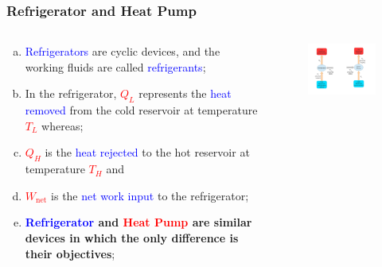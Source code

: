 \documentclass[10pt,compress,handout,ignorenonframetext]{beamer}
\begin{document}
\begin{frame}
 \frametitle{Refrigerator and Heat Pump}
  \begin{columns}
   \begin{column}[c]{0.45\linewidth}
     \begin{enumerate}[(a)]
     \item <1-> \textcolor{blue}{Refrigerators} are cyclic devices, and the working fluids are called \textcolor{blue}{refrigerants};
     \item <2-> In the refrigerator, \textcolor{red}{$Q_{L}$} represents the \textcolor{blue}{heat removed} from the cold reservoir at temperature \textcolor{red}{$T_{L}$} whereas;
     \item <3-> \textcolor{red}{$Q_{H}$} is the \textcolor{blue}{heat rejected} to the hot reservoir at temperature \textcolor{red}{$T_{H}$} and 
     \item <4-> \textcolor{red}{$W_{\text{net}}$} is the \textcolor{blue}{net work input} to the refrigerator;
     \item <5-> {\bf \textcolor{blue}{Refrigerator} and \textcolor{red}{Heat Pump} are similar devices in which the only difference is their objectives};
    \end{enumerate}
   \end{column}
   \begin{column}[c]{0.55\linewidth}
    \begin{figure}%
     \begin{center}
      \includegraphics[width=7.5cm,clip]{./Pics/Overview_Refrig2}
     \end{center}
    \end{figure}
   \end{column}  
  \end{columns}
\end{frame}
\end{document}
